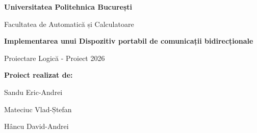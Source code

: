 \begin{titlepage}
    \begin{center}
        \vspace*{1cm}
        
        
        \vspace{1.5cm}
        
        {\Large \textbf{Universitatea Politehnica București} \par}
        \vspace{0.5cm}
        {\large Facultatea de Automatică și Calculatoare \par}
        
        \vspace{3cm}
        
        {\Huge \textbf{Implementarea unui Dispozitiv portabil de comunicații bidirecționale} \par}
        
        \vspace{0.5cm}
        {\Large Proiectare Logică - Proiect 2026 \par}
        

        \vspace{3cm}
        
        {\large \textbf{Proiect realizat de:} \par}
        \vspace{0.5cm}
        {\Large Sandu Eric-Andrei \par}
        \vspace{0.2cm}
        {\Large Mateciuc Vlad-Ștefan \par}
        \vspace{0.2cm}
        {\Large Hâncu David-Andrei \par}
        
        \vfill
        
    \end{center}
        
\end{titlepage}
